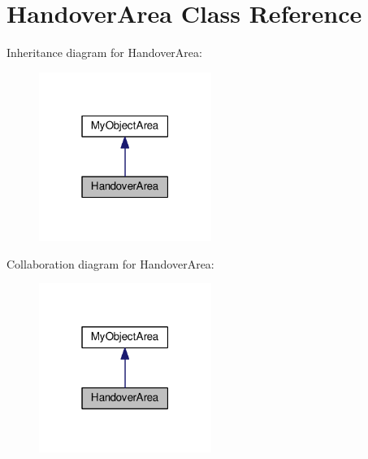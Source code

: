 \hypertarget{class_handover_area}{}\section{Handover\+Area Class Reference}
\label{class_handover_area}


Inheritance diagram for Handover\+Area\+:
\nopagebreak
\begin{figure}[H]
\begin{center}
\leavevmode
\includegraphics[width=159pt]{class_handover_area__inherit__graph}
\end{center}
\end{figure}


Collaboration diagram for Handover\+Area\+:
\nopagebreak
\begin{figure}[H]
\begin{center}
\leavevmode
\includegraphics[width=159pt]{class_handover_area__coll__graph}
\end{center}
\end{figure}
